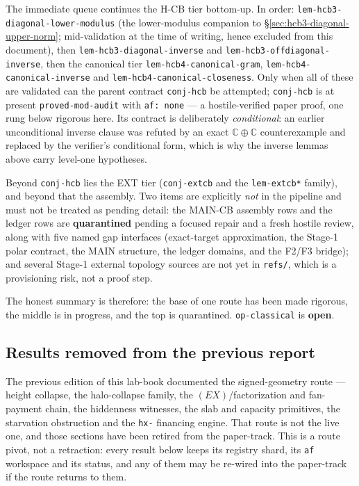 The immediate queue continues the H-CB tier bottom-up. In order:
\texttt{lem-hcb3-diagonal-lower-modulus} (the lower-modulus companion to
\S\ref{sec:hcb3-diagonal-upper-norm}; mid-validation at the time of writing, hence
excluded from this document), then
\texttt{lem-hcb3-diagonal-inverse} and \texttt{lem-hcb3-offdiagonal-inverse}, then the
canonical tier \texttt{lem-hcb4-canonical-gram},
\texttt{lem-hcb4-canonical-inverse} and \texttt{lem-hcb4-canonical-closeness}. Only when
all of these are validated can the parent contract \texttt{conj-hcb} be attempted;
\texttt{conj-hcb} is at present \texttt{proved-mod-audit} with \texttt{af: none} --- a
hostile-verified paper proof, one rung below rigorous here. Its contract is deliberately
\emph{conditional}: an earlier unconditional inverse clause was refuted by an exact
$\mathbb C\oplus\mathbb C$ counterexample and replaced by the verifier's conditional
form, which is why the inverse lemmas above carry level-one hypotheses.

Beyond \texttt{conj-hcb} lies the EXT tier (\texttt{conj-extcb} and the
\texttt{lem-extcb*} family), and beyond that the assembly. Two items are explicitly
\emph{not} in the pipeline and must not be treated as pending detail: the MAIN-CB
assembly rows and the ledger rows are \textbf{quarantined} pending a focused repair and a
fresh hostile review, along with five named gap interfaces (exact-target approximation,
the Stage-1 polar contract, the MAIN structure, the ledger domains, and the F2/F3
bridge); and several Stage-1 external topology sources are not yet in \texttt{refs/},
which is a provisioning risk, not a proof step.

The honest summary is therefore: the base of one route has been made rigorous, the middle
is in progress, and the top is quarantined. \texttt{op-classical} is \textbf{open}.

\subsection*{Results removed from the previous report}

The previous edition of this lab-book documented the signed-geometry route --- height
collapse, the halo-collapse family, the $(EX)$/factorization and fan-payment chain, the
hiddenness witnesses, the slab and capacity primitives, the starvation obstruction and
the \texttt{hx-} financing engine. That route is not the live one, and those sections have
been retired from the paper-track. This is a route pivot, not a retraction: every result
below keeps its registry shard, its \texttt{af} workspace and its status, and any of them
may be re-wired into the paper-track if the route returns to them.

